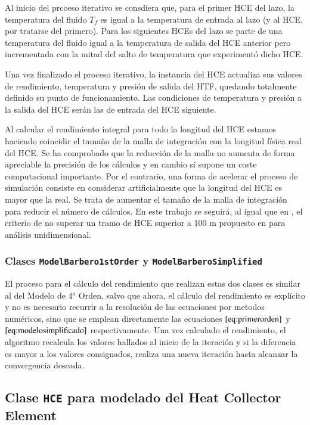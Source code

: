 Al inicio del prcoeso iterativo se consdiera que, para el primer HCE del lazo, la temperatura del fluido \(T_f\) es igual a la temperatura de entrada al lazo (y al HCE, por tratarse del primero). Para los siguientes HCEs del lazo se parte de una temperatura del fluido igual a la temperatura de salida del HCE anterior pero incrementada con la mitad del salto de temperatura que experimentó dicho HCE.

Una vez finalizado el proceso iterativo, la instancia del HCE actualiza sus valores de rendimiento, temperatura y presión de salida del HTF, quedando totalmente definido su punto de funcionamiento. Las condiciones de temperatura y presión a la salida del HCE serán las de entrada del HCE siguiente.

Al calcular el rendimiento integral para todo la longitud del HCE estamos haciendo coincidir el tamaño de la malla de integración con la longitud física real del HCE. Se ha comprobado que la reducción de la malla no aumenta de forma apreciable la precisión de los cálculos y en cambio sí supone un coste computacional importante. Por el contrario, una forma de acelerar el proceso de simulación consiste en considerar artificialmente que la longitud del HCE es mayor que la real. Se trata de aumentar el tamaño de la malla de integración para reducir el número de cálculos. En este trabajo se seguirá, al igual que en \cite{barberofresnoDesarrolloModeloTeorico2018}, el criterio de no superar un tramo de HCE superior a 100 m propuesto en \cite{forristallHeatTransferAnalysis2003} para análisis unidimensional. 

\subsubsection{Clases \texttt{ModelBarbero1stOrder}  y \texttt{ModelBarberoSimplified}}

El proceso para el cálculo del rendimiento que realizan estas dos clases es similar al del Modelo de 4$^o$ Orden, salvo que ahora, el cálculo del rendimiento es explícito y no es necesario recurrir a la resolución de las ecuaciones por metodos numéricos, sino que se emplean directamente las ecuaciones   \(\eqref{eq:primerorden}\) y \(\eqref{eq:modelosimplificado}\) respectivamente. Una vez calculado el rendimiento, el algoritmo recalcula los valores hallados al inicio de la iteración y si la diferencia es mayor a los valores consignados, realiza una nueva iteración hasta alcanzar la convergencia deseada.


\subsection{Clase \texttt{HCE} para modelado del Heat Collector Element}
\label{heat-collector-element-hce}

